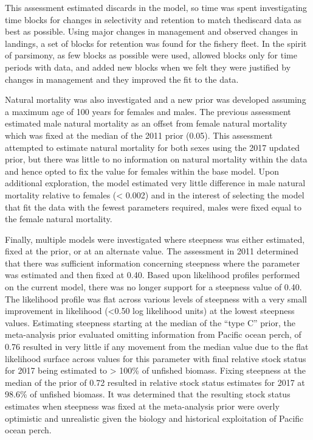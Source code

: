\documentclass[12pt,]{article}
\begin{document}
This assessment estimated discards in the model, so time was spent
investigating time blocks for changes in selectivity and retention to
match thediscard data as best as possible. Using major changes in
management and observed changes in landings, a set of blocks for
retention was found for the fishery fleet. In the spirit of parsimony,
as few blocks as possible were used, allowed blocks only for time
periods with data, and added new blocks when we felt they were justified
by changes in management and they improved the fit to the data.

Natural mortality was also investigated and a new prior was developed
assuming a maximum age of 100 years for females and males. The previous
assessment estimated male natural mortality as an offset from female
natural mortality which was fixed at the median of the 2011 prior
(0.05). This assessment attempted to estimate natural mortality for both
sexes using the 2017 updated prior, but there was little to no
information on natural mortality within the data and hence opted to fix
the value for females within the base model. Upon additional
exploration, the model estimated very little difference in male natural
mortality relative to females (\textless{} 0.002) and in the interest of
selecting the model that fit the data with the fewest parameters
required, males were fixed equal to the female natural mortality.

Finally, multiple models were investigated where steepness was either
estimated, fixed at the prior, or at an alternate value. The assessment
in 2011 determined that there was sufficient information concerning
steepness where the parameter was estimated and then fixed at 0.40.
Based upon likelihood profiles performed on the current model, there was
no longer support for a steepness value of 0.40. The likelihood profile
was flat across various levels of steepness with a very small
improvement in likelihood (\textless{}0.50 log likelihood units) at the
lowest steepness values. Estimating steepness starting at the median of
the ``type C'' prior, the meta-analysis prior evaluated omitting
information from Pacific ocean perch, of 0.76 resulted in very little if
any movement from the median value due to the flat likelihood surface
across values for this parameter with final relative stock status for
2017 being estimated to \textgreater{} 100\% of unfished biomass. Fixing
steepness at the median of the prior of 0.72 resulted in relative stock
status estimates for 2017 at 98.6\% of unfished biomass. It was
determined that the resulting stock status estimates when steepness was
fixed at the meta-analysis prior were overly optimistic and unrealistic
given the biology and historical exploitation of Pacific ocean perch.
\end{document}

